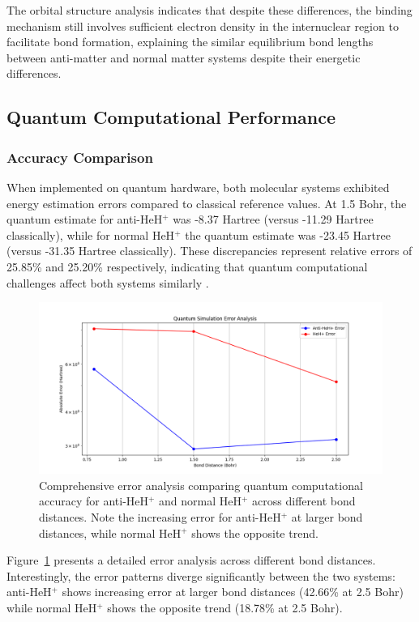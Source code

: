 \documentclass[10pt,twocolumn,a4paper]{article}
\begin{document}
The orbital structure analysis indicates that despite these differences, the binding mechanism still involves sufficient electron density in the internuclear region to facilitate bond formation, explaining the similar equilibrium bond lengths between anti-matter and normal matter systems despite their energetic differences.

\subsection{Quantum Computational Performance}

\subsubsection{Accuracy Comparison}
When implemented on quantum hardware, both molecular systems exhibited energy estimation errors compared to classical reference values. At 1.5 Bohr, the quantum estimate for anti-HeH$^+$ was -8.37 Hartree (versus -11.29 Hartree classically), while for normal HeH$^+$ the quantum estimate was -23.45 Hartree (versus -31.35 Hartree classically). These discrepancies represent relative errors of 25.85\% and 25.20\% respectively, indicating that quantum computational challenges affect both systems similarly \cite{sharma2020noise}.

\begin{figure}[t!]
    \centering
    \includegraphics[width=\columnwidth]{graphs/quantum_error_analysis.png}
    \caption{Comprehensive error analysis comparing quantum computational accuracy for anti-HeH$^+$ and normal HeH$^+$ across different bond distances. Note the increasing error for anti-HeH$^+$ at larger bond distances, while normal HeH$^+$ shows the opposite trend.}
    \label{fig:error_analysis}
\end{figure}

Figure~\ref{fig:error_analysis} presents a detailed error analysis across different bond distances. Interestingly, the error patterns diverge significantly between the two systems: anti-HeH$^+$ shows increasing error at larger bond distances (42.66\% at 2.5 Bohr) while normal HeH$^+$ shows the opposite trend (18.78\% at 2.5 Bohr).
\end{document}
